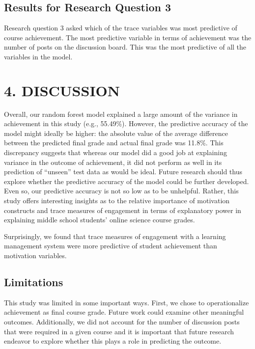 \documentclass[,acmart]{apa6}
\begin{document}
\subsection{Results for Research Question
3}\label{results-for-research-question-3}

Research question 3 asked which of the trace variables was most
predictive of course achievement. The most predictive variable in terms
of achievement was the number of posts on the discussion board. This was
the most predictive of all the variables in the model.

\section{4. DISCUSSION}\label{discussion}

Overall, our random forest model explained a large amount of the
variance in achievement in this study (e.g., 55.49\%). However, the
predictive accuracy of the model might ideally be higher: the absolute
value of the average difference between the predicted final grade and
actual final grade was 11.8\%. This discrepancy suggests that whereas
our model did a good job at explaining variance in the outcome of
achievement, it did not perform as well in its prediction of
\enquote{unseen} test data as would be ideal. Future research should
thus explore whether the predictive accuracy of the model could be
further developed. Even so, our predictive accuracy is not so low as to
be unhelpful. Rather, this study offers interesting insights as to the
relative importance of motivation constructs and trace measures of
engagement in terms of explanatory power in explaining middle school
students' online science course grades.

Surprisingly, we found that trace measures of engagement with a learning
management system were more predictive of student achievement than
motivation variables.

\subsection{Limitations}\label{limitations}

This study was limited in some important ways. First, we chose to
operationalize achievement as final course grade. Future work could
examine other meaningful outcomes. Additionally, we did not account for
the number of discussion posts that were required in a given course and
it is important that future research endeavor to explore whether this
plays a role in predicting the outcome.
\end{document}
